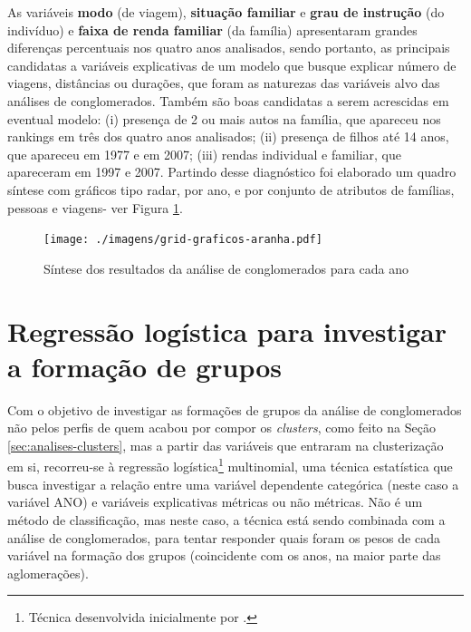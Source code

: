 As variáveis \textbf{modo} (de viagem), \textbf{situação familiar} e \textbf{grau de instrução} (do indivíduo) e \textbf{faixa de renda familiar} (da família) apresentaram grandes diferenças percentuais nos quatro anos analisados, sendo portanto, as principais candidatas a variáveis explicativas de um modelo que busque explicar número de viagens, distâncias ou durações, que foram as naturezas das variáveis alvo das análises de conglomerados.
Também são boas candidatas a serem acrescidas em eventual modelo:
(i) presença de 2 ou mais autos na família, que apareceu nos rankings em três dos quatro anos analisados;
(ii) presença de filhos até 14 anos, que apareceu em 1977 e em 2007;
(iii) rendas individual e familiar, que apareceram em 1997 e 2007.
Partindo desse diagnóstico foi elaborado um quadro síntese com gráficos tipo radar, por ano, e por conjunto de atributos de famílias, pessoas e viagens- ver Figura \ref{fig:rid-radar}. 

\newpage
\begin{landscape}

\begin{figure}[htb]%
    \caption{\label{fig:rid-radar}Síntese dos resultados da análise de conglomerados para cada ano}%
    \begin{center}%
        \texttt{[image: ./imagens/grid-graficos-aranha.pdf]}%
    \end{center}%
\end{figure}%

\end{landscape}


\clearpage
\section{Regressão logística para investigar a formação de grupos}\label{sec:analises-reg-log}

Com o objetivo de investigar as formações de grupos da análise de conglomerados não pelos perfis de quem acabou por compor os \textit{clusters}, como feito na Seção \ref{sec:analises-clusters}, mas a partir das variáveis que entraram na clusterização em si, recorreu-se à regressão logística\footnote{Técnica desenvolvida inicialmente por .} 
multinomial, uma técnica estatística que busca investigar a relação entre uma variável dependente categórica (neste caso a variável ANO) e variáveis explicativas métricas ou não métricas. Não é um método de classificação, mas neste caso, a técnica está sendo combinada com a análise de conglomerados, para tentar responder quais foram os pesos de cada variável na formação dos grupos (coincidente com os anos, na maior parte das aglomerações).

